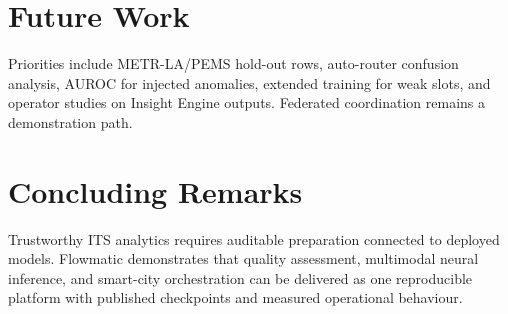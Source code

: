 \section{Future Work}

Priorities include METR-LA/PEMS hold-out rows, auto-router confusion analysis, AUROC for injected anomalies, extended training for weak slots, and operator studies on Insight Engine outputs. Federated coordination remains a demonstration path.

\section{Concluding Remarks}

Trustworthy ITS analytics requires auditable preparation connected to deployed models. Flowmatic demonstrates that quality assessment, multimodal neural inference, and smart-city orchestration can be delivered as one reproducible platform with published checkpoints and measured operational behaviour.
